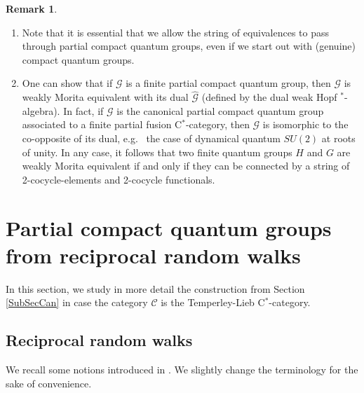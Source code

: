 \documentclass[10pt]{article}
\newcommand{\CatC}{\mathcal{C}}
\theoremstyle{definition}
\newtheorem{Rem}[Theorem]{Remark}
\numberwithin{equation}{section}
\begin{document}
\begin{Rem} 
\begin{enumerate}
\item Note that it is essential that we allow the string of equivalences to pass through partial compact quantum groups, even if we start out with (genuine) compact quantum groups.
\item One can show that if $\mathscr{G}$ is a finite partial compact quantum group, then $\mathscr{G}$ is weakly Morita equivalent with its dual $\widehat{\mathscr{G}}$ (defined by the dual weak Hopf $^*$-algebra). In fact, if $\mathscr{G}$ is the canonical partial compact quantum group associated to a finite partial fusion C$^*$-category, then $\mathscr{G}$ is isomorphic to the co-opposite of its dual, e.g.~ the case of dynamical quantum $SU(2)$ at roots of unity. In any case, it follows that two finite quantum groups $H$ and $G$ are weakly Morita equivalent if and only if they can be connected by a string of 2-cocycle-elements and 2-cocycle functionals. %
\end{enumerate}
\end{Rem}


\section{Partial compact quantum groups from reciprocal random walks}

In this section, we study in more detail the construction from Section \ref{SubSecCan} in case the category $\CatC$ is the Temperley-Lieb C$^*$-category.


\subsection{Reciprocal random walks}

We recall some notions introduced in \cite{DCY1}. We slightly change the terminology for the sake of convenience.
\end{document}
